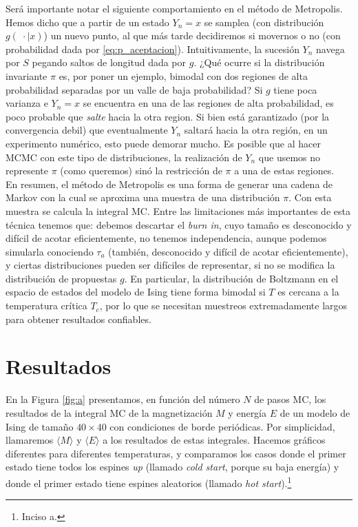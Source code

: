 \documentclass[a4paper,12pt]{article}
\begin{document}
Será importante notar el siguiente comportamiento en el método de Metropolis. Hemos dicho que a partir de un estado $Y_n = x$ se samplea (con distribución $g(\; \cdot \mid x)$) un nuevo punto, al que más tarde decidiremos si movernos o no (con probabilidad dada por \eqref{eq:p_aceptacion}). Intuitivamente, la sucesión $Y_n$ navega por $S$ pegando saltos de longitud dada por $g$. ¿Qué ocurre si la distribución invariante $\pi$ es, por poner un ejemplo, bimodal con dos regiones de alta probabilidad separadas por un valle de baja probabilidad? Si $g$ tiene poca varianza e $Y_n = x$ se encuentra en una de las regiones de alta probabilidad, es poco probable que {\it salte} hacia la otra region. Si bien está garantizado (por la convergencia debil) que eventualmente $Y_n$ saltará hacia la otra región, en un experimento numérico, esto puede demorar mucho. Es posible que al hacer MCMC con este tipo de distribuciones, la realización de $Y_n$ que usemos no represente $\pi$ (como queremos) sinó la restricción de $\pi$ a una de estas regiones.\\

En resumen, el método de Metropolis es una forma de generar una cadena de Markov con la cual se aproxima una muestra de una distribución $\pi$. Con esta muestra se calcula la integral MC. Entre las limitaciones más importantes de esta técnica tenemos que: debemos descartar el {\it burn in}, cuyo tamaño es desconocido y difícil de acotar eficientemente, no tenemos independencia, aunque podemos simularla conociendo $\tau_a$ (también, desconocido y difícil de acotar eficientemente), y ciertas distribuciones pueden ser difíciles de representar, si no se modifica la distribución de propuestas $g$. En particular, la distribución de Boltzmann en el espacio de estados del modelo de Ising tiene forma bimodal si $T$ es cercana a la temperatura crítica $T_c$, por lo que se necesitan muestreos extremadamente largos para obtener resultados confiables.

\section{Resultados}

En la Figura \ref{fig:a} presentamos, en función del número $N$ de pasos MC, los resultados de la integral MC de la magnetización $M$ y energía $E$ de un modelo de Ising de tamaño $40 \times 40$ con condiciones de borde periódicas. Por simplicidad, llamaremos $\langle M \rangle$ y $\langle E \rangle$ a los resultados de estas integrales. Hacemos gráficos diferentes para diferentes temperaturas, y comparamos los casos donde el primer estado tiene todos los espines {\it up} (llamado {\it cold start}, porque su baja energía) y donde el primer estado tiene espines aleatorios (llamado {\it hot start}).\footnote{Inciso a.}
\end{document}
